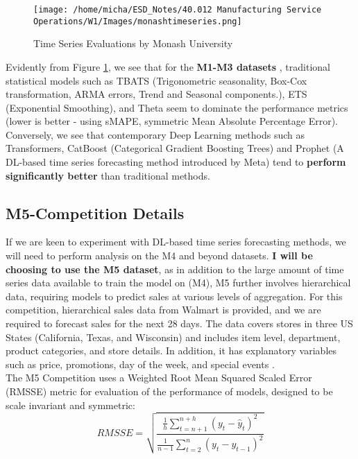 \documentclass[12pt]{article}
\begin{document}
\begin{figure}[H]
    \centering
    \texttt{[image: /home/micha/ESD\_Notes/40.012 Manufacturing Service Operations/W1/Images/monashtimeseries.png]}
    \caption{Time Series Evaluations by Monash University}
    \label{fig:6-monash}
\end{figure} 

\noindent Evidently from Figure \ref{fig:6-monash}, we see that for the \textbf{M1-M3 datasets} \cite{godahewa2021monash}, traditional statistical models such as TBATS (Trigonometric seasonality, Box-Cox transformation, ARMA errors, Trend and Seasonal components.), ETS (Exponential Smoothing), and Theta seem to dominate the performance metrics (lower is better - using sMAPE, symmetric Mean Absolute Percentage Error). Conversely, we see that contemporary Deep Learning methods such as Transformers, CatBoost (Categorical Gradient Boosting Trees) and Prophet (A DL-based time series forecasting method introduced by Meta) tend to \textbf{perform significantly better} than traditional methods.

\subsection*{M5-Competition Details}

If we are keen to experiment with DL-based time series forecasting methods, we will need to perform analysis on the M4 and beyond datasets. \textbf{I will be choosing to use the M5 dataset}, as in addition to the large amount of time series data available to train the model on (M4), M5 further involves hierarchical data, requiring models to predict sales at various levels of aggregation. For this competition, hierarchical sales data from Walmart is provided, and we are required to forecast sales for the next 28 days. The data covers stores in three US States (California, Texas, and Wisconsin) and includes item level, department, product categories, and store details. In addition, it has explanatory variables such as price, promotions, day of the week, and special events \cite{m5-forecasting-accuracy}. \\ 

\noindent The M5 Competition uses a Weighted Root Mean Squared Scaled Error (RMSSE) metric for evaluation of the performance of models, designed to be scale invariant and symmetric: \begin{equation}
    RMSSE = \sqrt{ \frac{\frac{1}{h} \sum_{t=n+1}^{n+h} (y_{t}-\hat{y}_t)^{2}}{\frac{1}{n-1} \sum_{t=2}^{n}(y_{t}-y_{t-1})^{2}}}
\end{equation}
\end{document}
